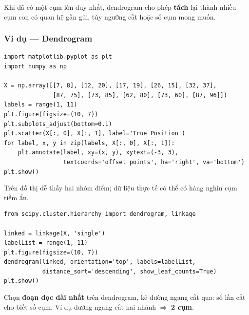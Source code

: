 \begin{ynghia}[title={Dendrogram sau khi gộp hết}]
Khi đã có một cụm lớn duy nhất, dendrogram cho phép \textbf{tách} lại thành nhiều cụm con có quan hệ gần gũi, tùy ngưỡng cắt hoặc số cụm mong muốn.
\end{ynghia}

\subsubsection{Ví dụ --- Dendrogram}

\begin{vidu}[title={Import và 10 điểm 2D}]
\begin{lstlisting}
import matplotlib.pyplot as plt
import numpy as np

X = np.array([[7, 8], [12, 20], [17, 19], [26, 15], [32, 37],
              [87, 75], [73, 85], [62, 80], [73, 60], [87, 96]])
labels = range(1, 11)
plt.figure(figsize=(10, 7))
plt.subplots_adjust(bottom=0.1)
plt.scatter(X[:, 0], X[:, 1], label='True Position')
for label, x, y in zip(labels, X[:, 0], X[:, 1]):
    plt.annotate(label, xy=(x, y), xytext=(-3, 3),
                 textcoords='offset points', ha='right', va='bottom')
plt.show()
\end{lstlisting}
\end{vidu}

\begin{ynghia}[title={Hai nhóm trực quan}]
Trên đồ thị dễ thấy hai nhóm điểm; dữ liệu thực tế có thể có hàng nghìn cụm tiềm ẩn.

\end{ynghia}

\begin{vidu}[title={Vẽ dendrogram với SciPy}]
\begin{lstlisting}
from scipy.cluster.hierarchy import dendrogram, linkage

linked = linkage(X, 'single')
labelList = range(1, 11)
plt.figure(figsize=(10, 7))
dendrogram(linked, orientation='top', labels=labelList,
           distance_sort='descending', show_leaf_counts=True)
plt.show()
\end{lstlisting}
\end{vidu}

\begin{ynghia}[title={Dendrogram linkage single}]
\end{ynghia}

\begin{phuongphap}[title={Chọn số cụm bằng khoảng cách dọc lớn nhất}]
Chọn \textbf{đoạn dọc dài nhất} trên dendrogram, kẻ đường ngang cắt qua: số lần cắt cho biết số cụm. Ví dụ đường ngang cắt hai nhánh $\Rightarrow$ \textbf{2 cụm}.

\end{phuongphap}

